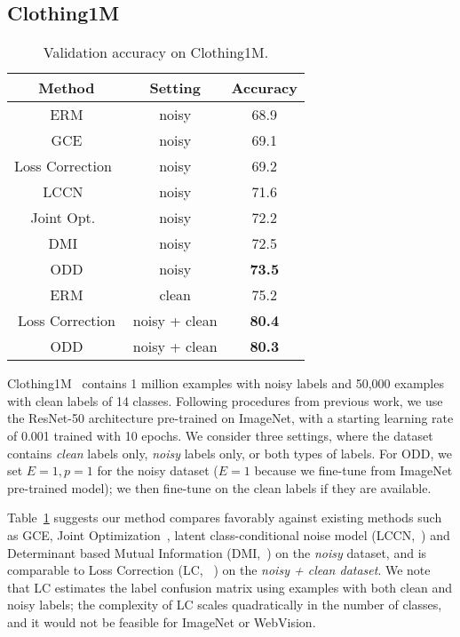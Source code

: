 \documentclass[a4paper,11pt]{article}
\begin{document}
\subsection{Clothing1M}
\label{sec:clothing1m}

\begin{table}
\centering
 \caption{Validation accuracy on Clothing1M.}
    \begin{tabular}{c|c|c}
    \toprule
        Method & Setting & Accuracy \\\midrule
        \textsc{ERM} & noisy & 68.9 \\
        GCE & noisy & 69.1 \\
        Loss Correction~\cite{patrini2017making} & noisy & 69.2 \\
        LCCN~\cite{yao2019safeguarded} & noisy & 71.6 \\
        Joint Opt.~\cite{tanaka2018joint} & noisy & 72.2 \\
        DMI~\cite{xu2019l_dmi} & noisy & 72.5 \\
        \textsc{ODD} & noisy & \textbf{73.5} \\\midrule
        \textsc{ERM} & clean & 75.2 \\
        Loss Correction & noisy + clean & \textbf{80.4} \\
        \textsc{ODD} & noisy + clean & \textbf{80.3} \\
        \bottomrule
    \end{tabular}
    \label{tab:clothing1m}
\end{table}

Clothing1M~\cite{xiao2015learning} contains 1 million examples with noisy labels and 50,000 examples with clean labels 
of 14 classes. Following procedures from previous work, we use the ResNet-50 architecture pre-trained on ImageNet, with a starting learning rate of 0.001 trained with 10 epochs. We consider three settings, where the dataset contains \textit{clean} labels only, \textit{noisy} labels only, or both types of labels. For \textsc{ODD}, we set $E = 1, p = 1$ for the noisy dataset ($E = 1$ because we fine-tune from ImageNet pre-trained model); we then fine-tune on the clean labels if they are available. 

Table~\ref{tab:clothing1m} suggests our method compares favorably against existing methods such as GCE, Joint Optimization~\cite{tanaka2018joint}, latent class-conditional noise
model (LCCN,~\cite{yao2019safeguarded}) and Determinant based Mutual
Information (DMI,~\cite{xu2019l_dmi}) on the \textit{noisy} dataset, and is comparable to Loss Correction (LC, ~\cite{patrini2017making}) on the \textit{noisy + clean dataset}. We note that LC estimates the label confusion matrix using examples with both clean and noisy labels; the complexity of LC scales quadratically in the number of classes, and it would not be feasible for ImageNet or WebVision.
\end{document}
